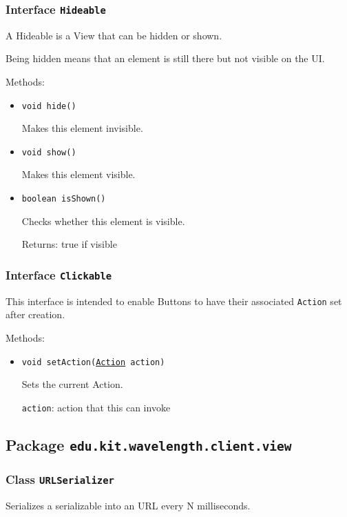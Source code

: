 \subsubsection{Interface \texttt{Hideable}}
\label{type:edu.kit.wavelength.client.view.api.Hideable}
A Hideable is a View that can be hidden or shown.
 
 Being hidden means that an element is still there but not visible on the UI.

Methods:
\begin{itemize}
\item \texttt{void hide()}

Makes this element invisible.

\item \texttt{void show()}

Makes this element visible.

\item \texttt{boolean isShown()}

Checks whether this element is visible.

Returns: true if visible

\end{itemize}

\subsubsection{Interface \texttt{Clickable}}
\label{type:edu.kit.wavelength.client.view.api.Clickable}
This interface is intended to enable Buttons to have their associated
 \texttt{Action} set after creation.

Methods:
\begin{itemize}
\item \texttt{void setAction(\hyperref[type:edu.kit.wavelength.client.view.action.Action]{Action} action)}

Sets the current Action.

\texttt{action}: action that this can invoke

\end{itemize}

\subsection{Package \lstinline{edu.kit.wavelength.client.view}}
\label{pkg:edu.kit.wavelength.client.view}


\subsubsection{Class \texttt{URLSerializer}}
\label{type:edu.kit.wavelength.client.view.URLSerializer}
Serializes a serializable into an URL every N milliseconds.


